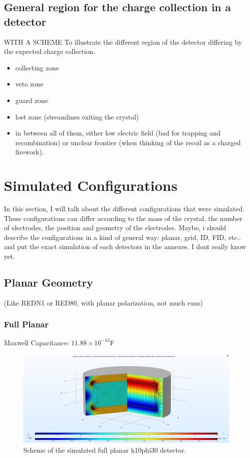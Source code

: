 \subsection{General region for the charge collection in a detector}

WITH A SCHEME
To illustrate the different region of the detector differing by the expected charge collection.

\begin{itemize}
	\item collecting zone
	\item veto zone
	\item guard zone
	\item lost zone (streamlines exiting the crystal)
	\item in between all of them, either low electric field (bad for trapping and recombination) or unclear frontier (when thinking of the recoil as a charged firework).
\end{itemize}

\section{Simulated Configurations}

In this section, I will talk about the different configurations that were simulated.
These configurations can differ according to the mass of the crystal, the number of electrodes, the position and geometry of the electrodes.
Maybe, i should describe the configurations in a kind of general way: planar, grid, ID, FID, etc.. and put the exact simulation of each detectors in the annexes. I dont really know yet.

\subsection{Planar Geometry}

(Like REDN1 or RED80, with planar polarization, not much runs)

\subsubsection{Full Planar}

Maxwell Capacitance: $11.88 \times 10^{-12}$F

\begin{figure}
\centering
\includegraphics[width=\linewidth]{Figures/Electrodes/full_planar.png}
\caption{Scheme of the simulated full planar h10phi30 detector.}
\label{fig:full-planar}
\end{figure}

